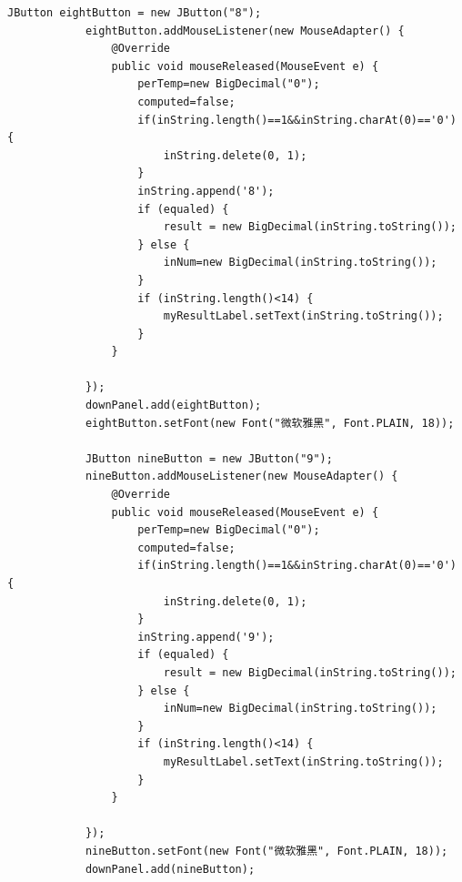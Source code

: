 \documentclass{ctexart}
\begin{document}
\begin{lstlisting}[caption=冗杂的代码]
            JButton eightButton = new JButton("8");
            eightButton.addMouseListener(new MouseAdapter() {
                @Override
                public void mouseReleased(MouseEvent e) {
                    perTemp=new BigDecimal("0");
                    computed=false;
                    if(inString.length()==1&&inString.charAt(0)=='0') {
                        inString.delete(0, 1);
                    }
                    inString.append('8');
                    if (equaled) {
                        result = new BigDecimal(inString.toString());		
                    } else {
                        inNum=new BigDecimal(inString.toString());
                    }
                    if (inString.length()<14) {
                        myResultLabel.setText(inString.toString());
                    }
                }
            
            });
            downPanel.add(eightButton);
            eightButton.setFont(new Font("微软雅黑", Font.PLAIN, 18));
            
            JButton nineButton = new JButton("9");
            nineButton.addMouseListener(new MouseAdapter() {
                @Override
                public void mouseReleased(MouseEvent e) {
                    perTemp=new BigDecimal("0");
                    computed=false;
                    if(inString.length()==1&&inString.charAt(0)=='0') {
                        inString.delete(0, 1);
                    }
                    inString.append('9');
                    if (equaled) {
                        result = new BigDecimal(inString.toString());		
                    } else {
                        inNum=new BigDecimal(inString.toString());
                    }
                    if (inString.length()<14) {
                        myResultLabel.setText(inString.toString());
                    }			
                }
            
            });
            nineButton.setFont(new Font("微软雅黑", Font.PLAIN, 18));
            downPanel.add(nineButton);
            

\end{lstlisting}
\end{document}
